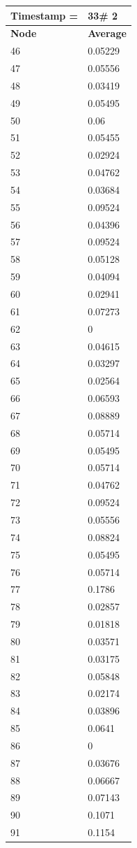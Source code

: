\begin{tabular}{|l||l|}
\hline
\textbf{Timestamp =} & \textbf{33}\# 2\\\hline
	\textbf{Node} & \textbf{Average} \\ \hline
\hline
	46 & 0.05229 \\ \hline
	47 & 0.05556 \\ \hline
	48 & 0.03419 \\ \hline
	49 & 0.05495 \\ \hline
	50 & 0.06 \\ \hline
	51 & 0.05455 \\ \hline
	52 & 0.02924 \\ \hline
	53 & 0.04762 \\ \hline
	54 & 0.03684 \\ \hline
	55 & 0.09524 \\ \hline
	56 & 0.04396 \\ \hline
	57 & 0.09524 \\ \hline
	58 & 0.05128 \\ \hline
	59 & 0.04094 \\ \hline
	60 & 0.02941 \\ \hline
	61 & 0.07273 \\ \hline
	62 & 0 \\ \hline
	63 & 0.04615 \\ \hline
	64 & 0.03297 \\ \hline
	65 & 0.02564 \\ \hline
	66 & 0.06593 \\ \hline
	67 & 0.08889 \\ \hline
	68 & 0.05714 \\ \hline
	69 & 0.05495 \\ \hline
	70 & 0.05714 \\ \hline
	71 & 0.04762 \\ \hline
	72 & 0.09524 \\ \hline
	73 & 0.05556 \\ \hline
	74 & 0.08824 \\ \hline
	75 & 0.05495 \\ \hline
	76 & 0.05714 \\ \hline
	77 & 0.1786 \\ \hline
	78 & 0.02857 \\ \hline
	79 & 0.01818 \\ \hline
	80 & 0.03571 \\ \hline
	81 & 0.03175 \\ \hline
	82 & 0.05848 \\ \hline
	83 & 0.02174 \\ \hline
	84 & 0.03896 \\ \hline
	85 & 0.0641 \\ \hline
	86 & 0 \\ \hline
	87 & 0.03676 \\ \hline
	88 & 0.06667 \\ \hline
	89 & 0.07143 \\ \hline
	90 & 0.1071 \\ \hline
	91 & 0.1154 \\ \hline
\end{tabular}
